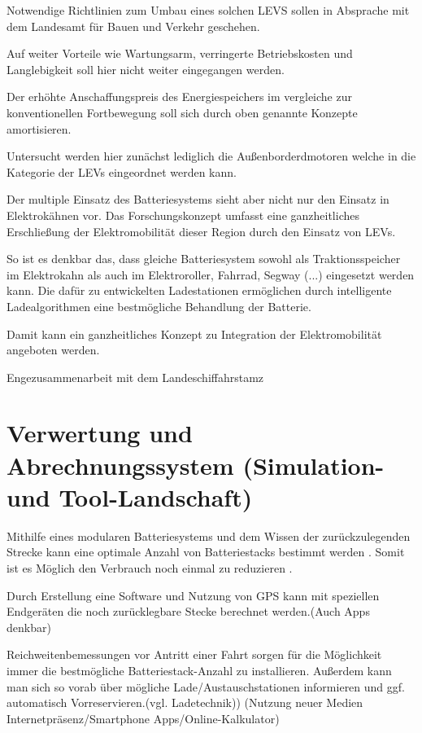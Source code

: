 Notwendige Richtlinien zum Umbau eines solchen LEVS sollen in Absprache mit dem Landesamt für Bauen und Verkehr geschehen. 

Auf weiter Vorteile wie Wartungsarm, verringerte Betriebskosten und Langlebigkeit soll hier nicht weiter eingegangen werden. 

Der erhöhte Anschaffungspreis des Energiespeichers im vergleiche zur konventionellen Fortbewegung soll sich durch oben genannte Konzepte amortisieren.

Untersucht werden hier zunächst lediglich die Außenborderdmotoren welche in die Kategorie der LEVs eingeordnet werden kann.

Der multiple Einsatz des Batteriesystems sieht aber nicht nur den Einsatz in Elektrokähnen vor.
Das Forschungskonzept umfasst eine ganzheitliches Erschließung der Elektromobilität dieser Region durch den Einsatz von LEVs.

So ist es denkbar das, dass gleiche Batteriesystem sowohl als Traktionsspeicher im Elektrokahn als auch im Elektroroller, Fahrrad, Segway (...) eingesetzt werden kann. Die dafür zu entwickelten Ladestationen ermöglichen durch intelligente Ladealgorithmen eine bestmögliche Behandlung der Batterie. 

Damit kann ein ganzheitliches Konzept zu Integration der Elektromobilität angeboten werden.

Engezusammenarbeit mit dem Landeschiffahrstamz


\section{Verwertung und Abrechnungssystem (Simulation- und Tool-Landschaft)}

Mithilfe eines modularen Batteriesystems und dem  Wissen der zurückzulegenden Strecke kann eine optimale Anzahl von Batteriestacks bestimmt werden . Somit ist es Möglich den Verbrauch noch einmal zu reduzieren . %

Durch Erstellung eine Software und Nutzung von GPS kann mit speziellen Endgeräten die noch zurücklegbare Stecke berechnet werden.(Auch Apps denkbar)

Reichweitenbemessungen vor Antritt einer Fahrt sorgen für die Möglichkeit immer die bestmögliche Batteriestack-Anzahl zu installieren. Außerdem kann man sich so vorab über mögliche Lade/Austauschstationen informieren und ggf. automatisch Vorreservieren.(vgl. Ladetechnik)) (Nutzung neuer Medien Internetpräsenz/Smartphone Apps/Online-Kalkulator)

